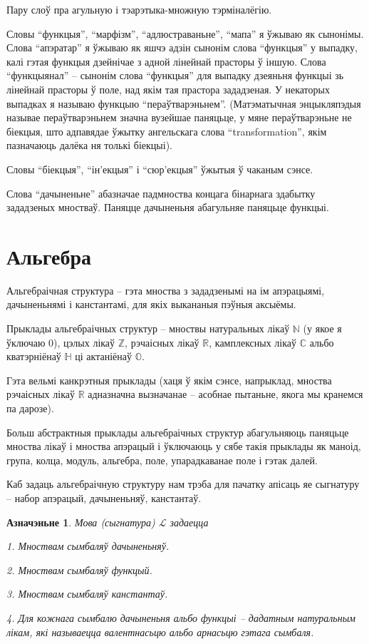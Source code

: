 \documentclass[a4paper,12pt]{book}
\newtheorem{definition}{Азначэньне}[section]
\begin{document}
Пару слоў пра агульную і тэарэтыка-множную тэрміналёгію.

Словы ``функцыя'', ``марфізм'', ``адлюстраваньне'', ``мапа'' я ўжываю
як сынонімы. Слова ``апэратар'' я ўжываю як яшчэ адзін сынонім слова
``функцыя'' у выпадку, калі гэтая функцыя дзейнічае з адной лінейнай
прасторы ў іншую. Слова ``функцыянал'' -- сынонім слова ``функцыя''
для выпадку дзеяньня функцыі зь лінейнай прасторы ў поле, над якім тая
прастора зададзеная. У некаторых выпадках я называю функцыю
``пераўтварэньнем''. (Матэматычная энцыкляпэдыя называе
пераўтварэньнем значна вузейшае паняцьце, у мяне пераўтварэньне не
біекцыя, што адпавядае ўжытку ангельскага слова ``transformation'',
якім пазначаюць далёка ня толькі біекцыі).

Словы ``біекцыя'', ``ін'екцыя'' і ``сюр'екцыя'' ўжытыя ў чаканым
сэнсе.

Слова ``дачыненьне'' абазначае падмноства концага бінарнага здабытку
зададзеных мностваў. Паняцце дачыненьня абагульняе паняцьце функцыі.

\section{Альгебра}

Альгебраічная структура -- гэта мноства з зададзенымі на ім
апэрацыямі, дачыненьнямі
і канстантамі, для якіх выкананыя пэўныя аксыёмы.

Прыклады альгебраічных структур -- мноствы натуральных лікаў
$\mathbb{N}$ (у якое я ўключаю $0$), цэлых лікаў $\mathbb{Z}$,
рэчаісных лікаў $\mathbb{R}$, камплексных лікаў $\mathbb{C}$ альбо
кватэрніёнаў $\mathbb{H}$ ці актаніёнаў $\mathbb{O}$.

Гэта вельмі канкрэтныя прыклады (хаця ў якім сэнсе, напрыклад, мноства
рэчаісных лікаў $\mathbb{R}$ адназначна вызначанае -- асобнае
пытаньне, якога мы кранемся па дарозе).

Больш абстрактныя прыклады альгебраічных структур абагульняюць
паняцьце мноства лікаў і мноства апэрацый і ўключаюць у сябе такія
прыклады як маноід, група, колца, модуль, альгебра, поле,
упарадкаванае поле і гэтак далей.

Каб задаць альгебраічную структуру нам трэба для пачатку апісаць яе
сыгнатуру --
набор апэрацый, дачыненьняў, канстантаў.

\begin{definition}
  Мова (сыгнатура) $\mathcal{L}$ задаецца

  1. Мноствам сымбаляў дачыненьняў.

  2. Мноствам сымбаляў функцый.

  3. Мноствам сымбаляў канстантаў.

  4. Для кожнага сымбалю дачыненьня альбо функцыі -- дадатным
  натуральным лікам, які называецца валентнасьцю альбо арнасьцю гэтага
  сымбаля.
\end{definition}
\end{document}
